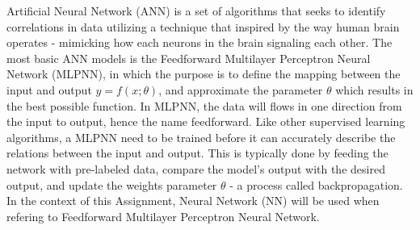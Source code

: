 \documentclass[../BachelorAssignment.tex]{subfiles}
\begin{document}


Artificial Neural Network (ANN) is a set of algorithms that seeks to identify correlations in data utilizing a technique that inspired by the way human brain operates - mimicking how each neurons in the brain signaling each other. The most basic ANN models is the Feedforward Multilayer Perceptron Neural Network (MLPNN), in which the purpose is to define the mapping between the input and output \(y = f(x;\theta)\), and approximate the parameter \(\theta\) which results in the best possible function. In MLPNN, the data will flows in one direction from the input to output, hence the name feedforward. Like other supervised learning algorithms, a MLPNN need to be trained before it can accurately describe the relations between the input and output. This is typically done by feeding the network with pre-labeled data, compare the model's output with the desired output, and update the weights parameter \(\theta\) - a process called backpropagation. In the context of this Assignment, Neural Network (NN) will be used when refering to Feedforward Multilayer Perceptron Neural Network. 


\end{document}
